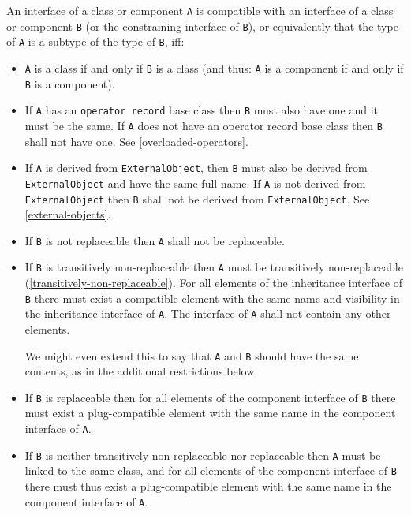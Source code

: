 An interface of a class or component \lstinline!A! is compatible with an interface of a class or component \lstinline!B! (or the constraining interface of \lstinline!B!), or equivalently that the type of \lstinline!A! is a subtype of the type of \lstinline!B!, iff:
\begin{itemize}
\item
  \lstinline!A! is a class if and only if \lstinline!B! is a class (and thus: \lstinline!A! is a component if and only if \lstinline!B! is a component).
\item
  If \lstinline!A! has an \lstinline!operator record! base class then \lstinline!B! must also have one and it must be the same.
  If \lstinline!A! does not have an operator record base class then \lstinline!B! shall not have one.
  See \cref{overloaded-operators}.
\item
  If \lstinline!A! is derived from \lstinline!ExternalObject!, then \lstinline!B! must also be derived from \lstinline!ExternalObject! and have the same full name.
  If \lstinline!A! is not derived from \lstinline!ExternalObject! then \lstinline!B! shall not be derived from \lstinline!ExternalObject!.
  See \cref{external-objects}.
\item
  If \lstinline!B! is not replaceable then \lstinline!A! shall not be replaceable.
\item
  If \lstinline!B! is transitively non-replaceable then \lstinline!A! must be transitively non-replaceable (\cref{transitively-non-replaceable}).
  For all elements of the inheritance interface of \lstinline!B! there must exist a compatible element with the same name and visibility in the inheritance interface of \lstinline!A!.
  The interface of \lstinline!A! shall not contain any other elements.
  \begin{nonnormative}
  We might even extend this to say that \lstinline!A! and \lstinline!B! should have the same contents, as in the additional restrictions below.
  \end{nonnormative}
\item
  If \lstinline!B! is replaceable then for all elements of the component interface of \lstinline!B! there must exist a plug-compatible element with the same name in the component interface of \lstinline!A!.
\item
  If \lstinline!B! is neither transitively non-replaceable nor replaceable then \lstinline!A! must be linked to the same class, and for all elements of the component interface of \lstinline!B! there must thus exist a plug-compatible element with the same name in the component interface of \lstinline!A!.

\end{itemize}
